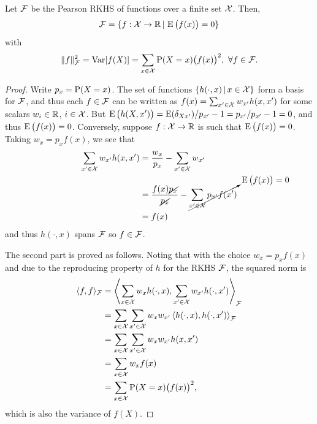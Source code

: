 \begin{proposition}
  Let ${\mathcal F}$ be the Pearson RKHS of functions over a finite set ${\mathcal X}$.
  Then,
  \[
    {\mathcal F} = \{f:{\mathcal X}\to\mathbb{R} \,|\, \operatorname{E} \big( f(x) \big) = 0 \}
  \]
  with
  \[
    \lVert f\rVert_{\mathcal F}^2 = \operatorname{Var} [f(X)] = \sum_{x\in{\mathcal X}} \operatorname{P}(X=x)\big( f(x) \big)^2, \ \forall f \in {\mathcal F}.
  \]
\end{proposition}

\begin{proof}
  Write $p_x = \operatorname{P}(X=x)$.
  The set of functions $\{h(\cdot,x) \,|\, x \in {\mathcal X}\}$ form a basis for ${\mathcal F}$, and thus each $f \in {\mathcal F}$ can be written as $f(x) = \sum_{x'\in{\mathcal X}} w_{x'}h(x,x')$ for some scalars $w_i\in\mathbb{R}$, $i\in{\mathcal X}$.
  But $\operatorname{E}\big( h(X,x')\big) = \operatorname{E} (\delta_{Xx'}) / p_{x'} - 1 = p_{x'} / p_{x'} - 1 = 0$, and thus $\operatorname{E} \big( f(x) \big) = 0$.
  Conversely, suppose $f:{\mathcal X}\to\mathbb{R}$ is such that $\operatorname{E} \big( f(x) \big) = 0$.
  Taking $w_x = p_xf(x)$, we see that
  \begin{align*}
    \sum_{x'\in{\mathcal X}} w_{x'}h(x,x') 
    &= \frac{w_x}{p_x} - \sum_{x'\in{\mathcal X}} w_{x'} \\
    &= \frac{f(x)\cancel{p_x}}{\cancel{p_x}} - \cancelto{\operatorname{E} \big( f(x) \big) = 0}{\sum_{x'\in{\mathcal X}} p_{x'}f(x')} \\ 
    &= f(x)
  \end{align*}
  and thus $h(\cdot,x)$ spans ${\mathcal F}$ so $f\in{\mathcal F}$.
  
  The second part is proved as follows.
  Noting that with the choice $w_x = p_xf(x)$ and due to the reproducing property of $h$ for the RKHS ${\mathcal F}$, the squared norm is 
  \begin{align*}
    \langle f,f\rangle_{\mathcal F} 
    &= \left\langle \sum_{x\in{\mathcal X}} w_{x}h(\cdot,x), \sum_{x'\in{\mathcal X}} w_{x'}h(\cdot,x') \right\rangle_{\mathcal F} \\
    &= \sum_{x\in{\mathcal X}} \sum_{x'\in{\mathcal X}} w_{x} w_{x'} \left\langle h(\cdot,x), h(\cdot,x') \right\rangle_{\mathcal F} \\
    &= \sum_{x\in{\mathcal X}} \sum_{x'\in{\mathcal X}} w_{x} w_{x'} h(x,x')  \\
    &= \sum_{x\in{\mathcal X}} w_{x} f(x) \\
    &= \sum_{x\in{\mathcal X}} \operatorname{P}(X=x) \big( f(x) \big)^2,
  \end{align*}
  which is also the variance of $f(X)$.
  \vspace{-0.5em}
\end{proof}


